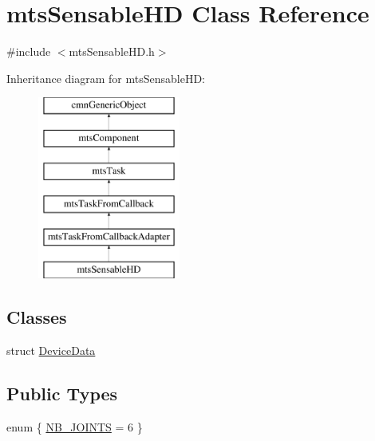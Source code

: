 \hypertarget{classmts_sensable_h_d}{}\section{mts\+Sensable\+H\+D Class Reference}
\label{classmts_sensable_h_d}


{\ttfamily \#include $<$mts\+Sensable\+H\+D.\+h$>$}

Inheritance diagram for mts\+Sensable\+H\+D\+:\begin{figure}[H]
\begin{center}
\leavevmode
\includegraphics[height=6.000000cm]{d1/d8f/classmts_sensable_h_d}
\end{center}
\end{figure}
\subsection*{Classes}
\begin{DoxyCompactItemize}
\item 
struct \hyperlink{structmts_sensable_h_d_1_1_device_data}{Device\+Data}
\end{DoxyCompactItemize}
\subsection*{Public Types}
\begin{DoxyCompactItemize}
\item 
enum \{ \hyperlink{classmts_sensable_h_d_a4318c41a9c93b48821fbd42fd8d6b387aa92e43e72ff821fcb7bb36577c22cab4}{N\+B\+\_\+\+J\+O\+I\+N\+T\+S} = 6
 \}
\end{DoxyCompactItemize}
